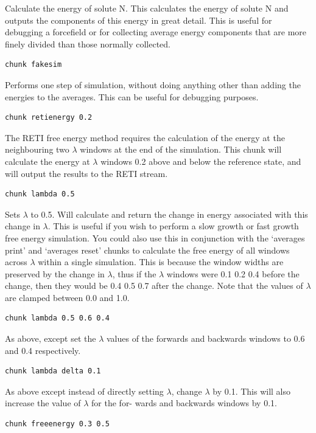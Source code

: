 \documentclass[letterpaper,10pt,english]{manual}
\begin{document}
Calculate the energy of solute N. This calculates the energy of solute N and outputs the components of this energy in great detail. This is useful for debugging a forcefield or for collecting average energy components that are more finely divided than those normally collected.
\begin{Verbatim}[commandchars=@\[\]]
chunk fakesim
\end{Verbatim}

Performs one step of simulation, without doing anything other than adding the energies to the averages. This can be useful for debugging purposes.
\begin{Verbatim}[commandchars=@\[\]]
chunk retienergy 0.2
\end{Verbatim}

The RETI free energy method requires the calculation of the energy at the neighbouring two $\lambda$ windows at the end of the simulation. This chunk will calculate the energy at $\lambda$ windows 0.2 above and below the reference state, and will output the results to the RETI stream.
\begin{Verbatim}[commandchars=@\[\]]
chunk lambda 0.5
\end{Verbatim}

Sets $\lambda$ to 0.5. Will calculate and return the change in energy associated with this change in $\lambda$. This is useful if you wish to perform a slow growth or fast growth free energy simulation. You could also use this in conjunction with the ‘averages print’ and ‘averages reset’ chunks to calculate the free energy of all windows across $\lambda$ within a single simulation. This is because the window widths are preserved by the change in $\lambda$, thus if the $\lambda$ windows were 0.1 0.2 0.4 before the change, then they would be 0.4 0.5 0.7 after the change. Note that the values of $\lambda$ are clamped between 0.0 and 1.0.

\begin{Verbatim}[commandchars=@\[\]]
chunk lambda 0.5 0.6 0.4
\end{Verbatim}

As above, except set the $\lambda$ values of the forwards and backwards windows to 0.6 and 0.4 respectively.

\begin{Verbatim}[commandchars=@\[\]]
chunk lambda delta 0.1
\end{Verbatim}

As above except instead of directly setting $\lambda$, change $\lambda$ by 0.1. This will also increase the value of $\lambda$ for the for- wards and backwards windows by 0.1.
\begin{Verbatim}[commandchars=@\[\]]
chunk freeenergy 0.3 0.5
\end{Verbatim}
\end{document}
